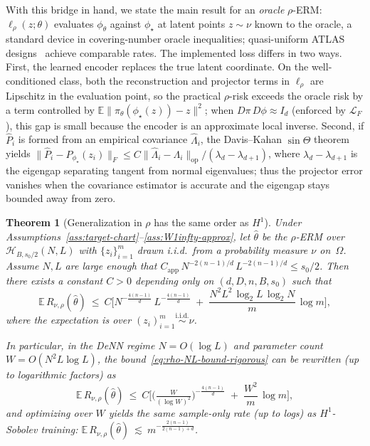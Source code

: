 \documentclass[11pt]{article}
\newcommand{\E}{\mathbb{E}}
\newcommand{\cH}{\mathcal{H}}
\newcommand{\cL}{\mathcal{L}}
\newcommand{\Om}{\Omega}
\newcommand{\norm}[1]{\lVert#1\rVert}
\newtheorem{thm}{Theorem}[section]
\begin{document}
With this bridge in hand, we state the main result
for an \emph{oracle} $\rho$-ERM:
$\ell_\rho(z;\theta)$ evaluates $\phi_\theta$ against
$\phi_\star$ at latent points $z\sim\nu$ known to the
oracle, a standard device in covering-number oracle
inequalities; quasi-uniform ATLAS
designs~\cite{Gyrfi2002ADT} achieve comparable rates.
The implemented loss differs in two ways.
First, the learned encoder replaces the true latent
coordinate.  On the well-conditioned class, both the
reconstruction and projector terms in $\ell_\rho$ are
Lipschitz in the evaluation point, so the practical
$\rho$-risk exceeds the oracle risk by a term
controlled by
$\E\norm{\pi_\theta(\phi_\star(z))-z}^2$;
when $D\pi\,D\phi\approx I_d$ (enforced by $\cL_F$),
this gap is small because the encoder is an approximate
local inverse.
Second, if $\hat P_i$ is formed from an empirical
covariance $\hat\Lambda_i$, the Davis--Kahan
$\sin\Theta$ theorem yields
$\norm{\hat P_i - P_{\phi_\star}(z_i)}_F
 \le C\norm{\hat\Lambda_i-\Lambda_i}_{\mathrm{op}}
     /(\lambda_d-\lambda_{d+1})$,
where $\lambda_d{-}\lambda_{d+1}$ is the eigengap
separating tangent from normal eigenvalues; thus the
projector error vanishes when the covariance estimator
is accurate and the eigengap stays bounded away from
zero.  %


\begin{thm}[Generalization in $\rho$ has the same order as
$H^1$]\label{thm:rho-gen-same-order-rigorous}
Under Assumptions~\ref{ass:target-chart}--\ref{ass:W1infty-approx},
let $\hat\theta$ be the $\rho$-ERM over
$\cH_{B,s_0/2}(N,L)$ with $\{z_i\}_{i=1}^m$ drawn i.i.d.\ from a
probability measure $\nu$ on~$\Om$.
Assume $N,L$ are large enough that
$C_{\mathrm{app}}\,N^{-{2(n-1)}/{d}}\,L^{-{2(n-1)}/{d}}\le s_0/2$.
Then there exists a constant $C>0$ depending only on
$(d,D,n,B,s_0)$ such that
\begin{equation}\label{eq:rho-NL-bound-rigorous}
  \E\,R_{\nu,\rho}(\hat\theta)
  \ \le\
  C\Bigg[
    N^{-\frac{4(n-1)}{d}}\,L^{-\frac{4(n-1)}{d}}
    \;+\;
    \frac{N^2L^2\,\log_2 L\,\log_2 N}{m}\,\log m
  \Bigg],
\end{equation}
where the expectation is over $(z_i)_{i=1}^m\stackrel{\text{i.i.d.}}{\sim}\nu$.

In particular, in the DeNN regime $N=O(\log L)$ and parameter count
$W=O(N^2L\log L)$, the bound~\eqref{eq:rho-NL-bound-rigorous} can be
rewritten (up to logarithmic factors) as
\begin{equation}\label{eq:rho-WM-bound-rigorous}
  \E\,R_{\nu,\rho}(\hat\theta)
  \ \le\
  C\Bigg[
    \Big(\tfrac{W}{(\log W)^2}\Big)^{-\frac{4(n-1)}{d}}
    \;+\;
    \frac{W^2}{m}\,\log m
  \Bigg],
\end{equation}
and optimizing over $W$ yields the same sample-only rate (up to logs)
as $H^1$-Sobolev training:
  $\E\,R_{\nu,\rho}(\hat\theta)
  \ \lesssim\ m^{-\frac{2(n-1)}{2(n-1)+d}}$.
\end{thm}
\end{document}
